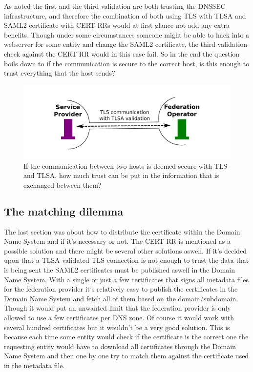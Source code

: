 As noted the first and the third validation are both trusting the DNSSEC infrastructure, and therefore the combination of both using TLS with TLSA and SAML2 certificate with CERT RRs would at first glance not add any extra benefits.
Though under some circumstances someone might be able to hack into a webserver for some entity and change the SAML2 certificate, the third validation check against the CERT RR would in this case fail.
So in the end the question boils down to if the communication is secure to the correct host, is this enough to trust everything that the host sends?

\begin{figure}[ht]
\begin{center}
\includegraphics[scale=1]{Figures/onlyUseTLS.png}
\end{center}
\caption{If the communication between two hosts is deemed secure with TLS and TLSA, how much trust can be put in the information that is exchanged between them?
\label{ch4:onlyUseTLS}}
\end{figure}

\subsection{The matching dilemma}
\label{subsec:matching-dilemma}
The last section was about how to distribute the certificate within the Domain Name System and if it's necessary or not.
The CERT RR is mentioned as a possible solution and there might be several other solutions aswell.
If it's decided upon that a TLSA validated TLS connection is not enough to trust the data that is being sent the SAML2 certificates must be published aswell in the Domain Name System.
With a single or just a few certificates that signs all metadata files for the federation provider it's relatively easy to publish the certificates in the Domain Name System and fetch all of them based on the domain/subdomain.
Though it would put an unwanted limit that the federation provider is only allowed to use a few certificates per DNS zone.
Of course it would work with several hundred certificates but it wouldn't be a very good solution.
This is because each time some entity would check if the certificate is the correct one the requesting entity would have to download all certificates through the Domain Name System and then one by one try to match them against the certificate used in the metadata file.

